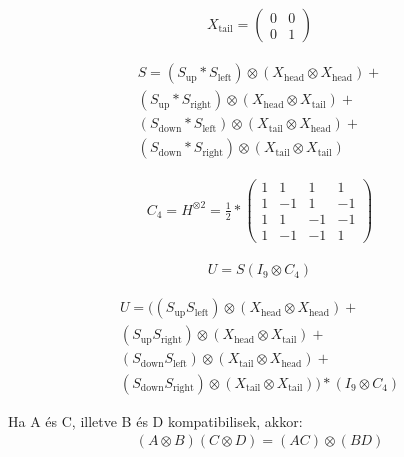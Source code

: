 \begin{align}
  X_{\text{tail}} =
  \begin{pmatrix}
    0 & 0 \\
    0 & 1
  \end{pmatrix}
\end{align}


\begin{align}
  S =
  (S_{\text{up}} * S_{\text{left}}) \otimes (X_{\text{head}} \otimes X_{\text{head}}) +   \\
  (S_{\text{up}} * S_{\text{right}}) \otimes (X_{\text{head}} \otimes X_{\text{tail}}) +  \\
  (S_{\text{down}} * S_{\text{left}}) \otimes (X_{\text{tail}} \otimes X_{\text{head}}) + \\
  (S_{\text{down}} * S_{\text{right}}) \otimes (X_{\text{tail}} \otimes X_{\text{tail}})
\end{align}

\begin{align}
  C_4 = H^{\otimes2} = \frac{1}{2} *
  \begin{pmatrix}
    1 & 1  & 1  & 1  \\
    1 & -1 & 1  & -1 \\
    1 & 1  & -1 & -1 \\
    1 & -1 & -1 & 1
  \end{pmatrix}
\end{align}

\begin{align}
  U = S  (I_9 \otimes C_4)
\end{align}

\begin{align}
  U =
  ((S_{\text{up}}  S_{\text{left}}) \otimes (X_{\text{head}} \otimes X_{\text{head}}) +  \\
  (S_{\text{up}} S_{\text{right}}) \otimes (X_{\text{head}} \otimes X_{\text{tail}}) +   \\
  (S_{\text{down}}  S_{\text{left}}) \otimes (X_{\text{tail}} \otimes X_{\text{head}}) + \\
  (S_{\text{down}} S_{\text{right}}) \otimes (X_{\text{tail}} \otimes X_{\text{tail}}))
  * (I_9 \otimes C_4)
\end{align}

Ha A és C, illetve B és D kompatibilisek, akkor:
\begin{align}
  (A \otimes B)(C \otimes D) = (AC) \otimes (BD)
\end{align}


